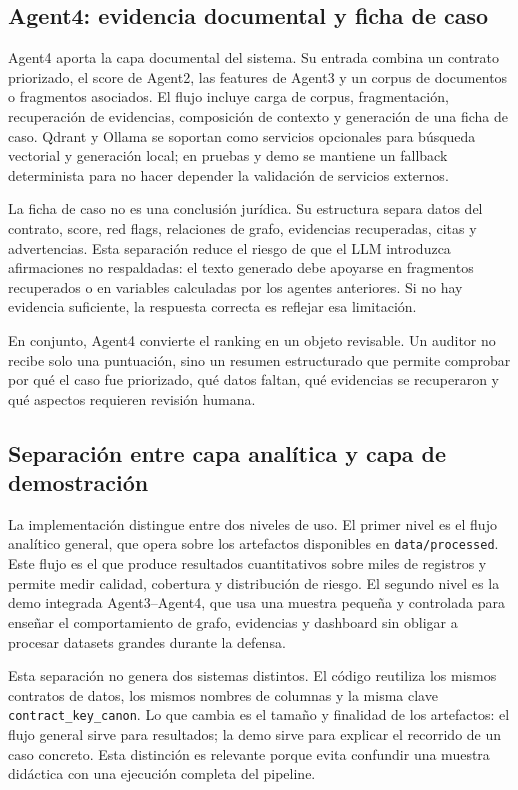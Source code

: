 \documentclass[11pt,a4paper,spanish]{book}
\numberwithin{equation}{chapter}
\numberwithin{figure}{chapter}
\begin{document}
\subsection{Agent4: evidencia documental y ficha de caso}

Agent4 aporta la capa documental del sistema. Su entrada combina un contrato priorizado, el score de
Agent2, las features de Agent3 y un corpus de documentos o fragmentos asociados. El flujo incluye
carga de corpus, fragmentaci{\'o}n, recuperaci{\'o}n de evidencias, composici{\'o}n de contexto y
generaci{\'o}n de una ficha de caso. Qdrant y Ollama se soportan como servicios opcionales para
b{\'u}squeda vectorial y generaci{\'o}n local; en pruebas y demo se mantiene un fallback determinista
para no hacer depender la validaci{\'o}n de servicios externos.

La ficha de caso no es una conclusi{\'o}n jur{\'i}dica. Su estructura separa datos del contrato, score,
red flags, relaciones de grafo, evidencias recuperadas, citas y advertencias. Esta separaci{\'o}n
reduce el riesgo de que el LLM introduzca afirmaciones no respaldadas: el texto generado debe
apoyarse en fragmentos recuperados o en variables calculadas por los agentes anteriores. Si no hay
evidencia suficiente, la respuesta correcta es reflejar esa limitaci{\'o}n.

En conjunto, Agent4 convierte el ranking en un objeto revisable. Un auditor no recibe solo una
puntuaci{\'o}n, sino un resumen estructurado que permite comprobar por qu{\'e} el caso fue priorizado,
qu{\'e} datos faltan, qu{\'e} evidencias se recuperaron y qu{\'e} aspectos requieren revisi{\'o}n humana.

\subsection{Separaci{\'o}n entre capa anal{\'i}tica y capa de demostraci{\'o}n}

La implementaci{\'o}n distingue entre dos niveles de uso. El primer nivel es el flujo anal{\'i}tico
general, que opera sobre los artefactos disponibles en \texttt{data/processed}. Este flujo es el que
produce resultados cuantitativos sobre miles de registros y permite medir calidad, cobertura y
distribuci{\'o}n de riesgo. El segundo nivel es la demo integrada Agent3--Agent4, que usa una muestra
peque{\~n}a y controlada para ense{\~n}ar el comportamiento de grafo, evidencias y dashboard sin
obligar a procesar datasets grandes durante la defensa.

Esta separaci{\'o}n no genera dos sistemas distintos. El c{\'o}digo reutiliza los mismos contratos de
datos, los mismos nombres de columnas y la misma clave \texttt{contract\_key\_canon}. Lo que cambia es
el tama{\~n}o y finalidad de los artefactos: el flujo general sirve para resultados; la demo sirve
para explicar el recorrido de un caso concreto. Esta distinci{\'o}n es relevante porque evita
confundir una muestra did{\'a}ctica con una ejecuci{\'o}n completa del pipeline.
\end{document}
